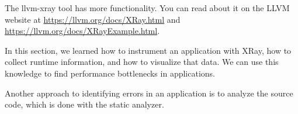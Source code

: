 \begin{tcolorbox}[colback=blue!5!white,colframe=blue!75!black, title=Tip]
The llvm-xray tool has more functionality. You can read about it on the LLVM website at \url{https://llvm.org/docs/XRay.html} and \url{https://llvm.org/docs/XRayExample.html}.
\end{tcolorbox}

In this section, we learned how to instrument an application with XRay, how to collect runtime information, and how to visualize that data. We can use this knowledge to find performance bottlenecks in applications.\par

Another approach to identifying errors in an application is to analyze the source code, which is done with the static analyzer.\par
















